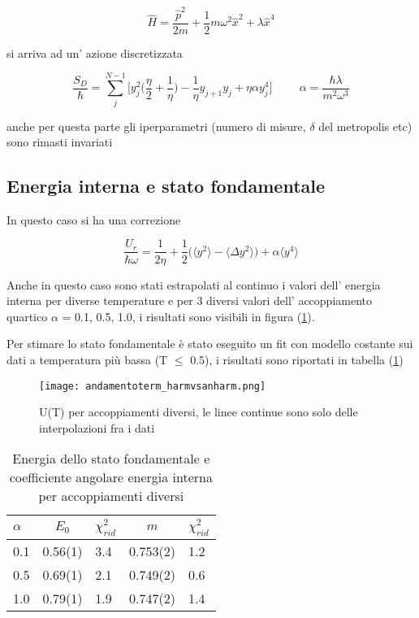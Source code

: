 \documentclass{article}
\begin{document}
\begin{equation}
    \hat{H} = \frac{\hat{p}^2}{2m} + \frac{1}{2}m\omega^2\hat{x}^2 + \lambda \hat{x}^4
\end{equation}

si arriva ad un' azione discretizzata

\begin{equation}
\frac{S_D}{\hbar}=\displaystyle\sum_j^{N-1} \Bigg[y^2_j\Big(\frac{\eta}{2}+\frac{1}{\eta}\Big)
-\frac{1}{\eta}y_{j+1}y_j +\eta\alpha y_j^4\Bigg] \hspace{1cm} \alpha = \frac{\hbar\lambda}{m^2\omega^3}
\end{equation}

anche per questa parte gli iperparametri (numero di misure, $\delta$ del metropolis etc) sono rimasti invariati

\subsection{Energia interna e stato fondamentale}

In questo caso si ha una correzione

\begin{equation}
\frac{U_r}{\hbar\omega} = \frac{1}{2\eta} + \frac{1}{2}\Big(\langle y^2\rangle - \langle \Delta y^2 \rangle\Big) + \alpha\langle y^4\rangle
\end{equation}

Anche in questo caso sono stati estrapolati al continuo i valori dell' energia interna per diverse temperature e per 3 diversi valori dell' accoppiamento quartico $\alpha$ = 0.1, 0.5, 1.0, i risultati sono visibili in figura (\ref{fig:andamentotermico}).

Per stimare lo stato fondamentale è stato eseguito un fit con modello costante sui dati a temperatura più bassa (T $\leq$ 0.5), i risultati sono riportati in tabella (\ref{E0anharm})

\begin{figure}[h]
    \centering
    \texttt{[image: andamentoterm\_harmvsanharm.png]}
    \caption{U(T) per accoppiamenti diversi, le linee continue sono solo delle interpolazioni fra i dati}
    \label{fig:andamentotermico}
\end{figure}

\begin{table}[h]
\centering
\begin{tabular}{lclcl}
$\alpha$ & $E_0$    & $\chi^2_{rid}$ & $m$ & $\chi^2_{rid}$\\ \hline
\hline
0.1      & 0.56(1) & 3.4 & 0.753(2) & 1.2         \\
0.5      & 0.69(1) & 2.1 & 0.749(2)& 0.6                \\
1.0      & 0.79(1) & 1.9 & 0.747(2)&1.4               
\end{tabular}
\caption{Energia dello stato fondamentale e coefficiente angolare energia interna per accoppiamenti diversi}
\label{E0anharm}
\end{table}
\end{document}
